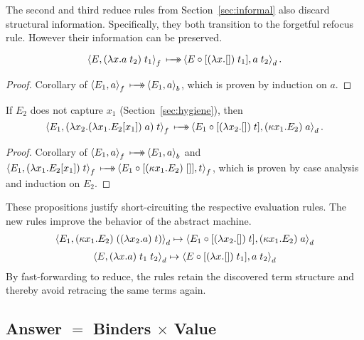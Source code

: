 \documentclass{LMCS}
\theoremstyle{plain}
\theoremstyle{remark}
\newcommand{\mapsTo}[0]{\mbox{\ensuremath{\makebox[0pt][l]{\hspace{7pt}$\rightarrow$}\longmapsto}}}
\renewcommand{\comp}[0]{\ensuremath{\circ}}
\newcommand{\refocus}[1]{\Braket{#1}_f}
\newcommand{\rebuild}[1]{\Braket{#1}_b}
\newcommand{\reduce}[1]{\Braket{#1}_d}
\begin{document}
The second and third reduce rules from Section~\ref{sec:informal} also discard
structural information.  Specifically, they both transition to the forgetful
refocus rule.  However their information can be preserved.
\begin{prop}
  \begin{equation*}
      \refocus{E, (\lambda x.a\;t_2)\; t_1} \mapsTo
      \reduce{E \comp [(\lambda x.[])\;t_1], a\;t_2}.
  \end{equation*}
\end{prop}
\begin{proof}
  Corollary of $\refocus{E_1, a} \mapsTo \rebuild{E_1,a}$, which is proven by
  induction on $a$.
\end{proof}
\begin{prop}
  If $E_2$ does not capture $x_1$ (Section~\ref{sec:hygiene}), then
  \begin{equation*}
    \refocus{E_1,(\lambda x_2.(\lambda x_1.E_2[x_1])\; a)\; t} \mapsTo 
    \reduce{E_1 \comp [(\lambda x_2.[])\; t], (\kappa x_1.E_2)\; a}.
  \end{equation*}
\end{prop}
\begin{proof}
  Corollary of $\refocus{E_1, a} \mapsTo \rebuild{E_1,a}$ and \\
    $\refocus{E_1,(\lambda x_1.E_2[x_1])\; t} \mapsTo
    \refocus{E_1 \comp [(\kappa x_1.E_2)\; []], t} $, which is proven by case
    analysis and induction on $E_2$.
\end{proof}
These propositions justify short-circuiting the respective evaluation rules.
The new rules improve the behavior of the abstract machine.
\begin{equation*}
\reduce{E_1, (\kappa x_1.E_2)\;((\lambda x_2. a)\; t)} \mapsto
\reduce{E_1 \comp [(\lambda x_2.[])\; t], (\kappa x_1.E_2)\; a}
\end{equation*}
\begin{gather*}
\reduce{E, (\lambda x. a)\; t_1\; t_2}
\mapsto 
\reduce{E \comp [(\lambda x.[])\;t_1], a\;t_2}
\end{gather*}
By fast-forwarding
to reduce, the rules retain the discovered term structure and thereby
avoid retracing the same terms again.


\subsection{Answer \texorpdfstring{$=$}{=} Binders \texorpdfstring{$\times$}{x} Value}
\end{document}

